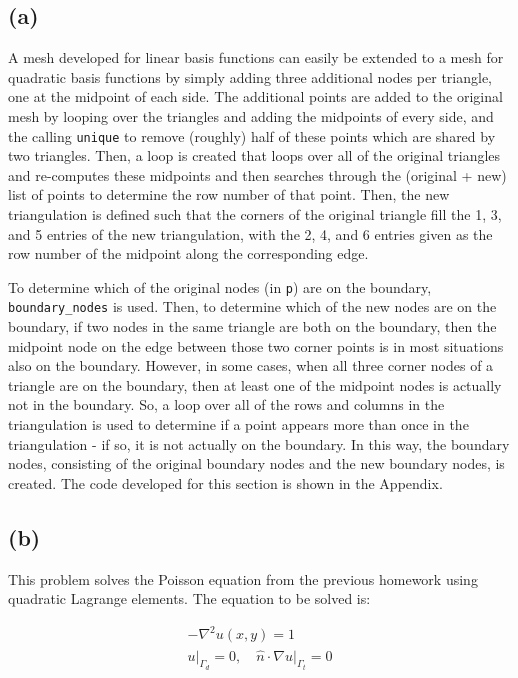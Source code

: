 \documentclass[10pt]{article}
\newcommand{\beqa}{\begin{equation}\begin{aligned}}
\newcommand{\eeqa}{\end{aligned}\end{equation}}
\begin{document}
\subsection{(a)}

A mesh developed for linear basis functions can easily be extended to a mesh for quadratic basis functions by simply adding three additional nodes per triangle, one at the midpoint of each side. The additional points are added to the original mesh by looping over the triangles and adding the midpoints of every side, and the calling {\tt unique} to remove (roughly) half of these points which are shared by two triangles. Then, a loop is created that loops over all of the original triangles and re-computes these midpoints and then searches through the (original + new) list of points to determine the row number of that point. Then, the new triangulation is defined such that the corners of the original triangle fill the 1, 3, and 5 entries of the new triangulation, with the 2, 4, and 6 entries given as the row number of the midpoint along the corresponding edge.

To determine which of the original nodes (in {\tt p}) are on the boundary, {\tt boundary\_nodes} is used. Then, to determine which of the new nodes are on the boundary, if two nodes in the same triangle are both on the boundary, then the midpoint node on the edge between those two corner points is in most situations also on the boundary. However, in some cases, when all three corner nodes of a triangle are on the boundary, then at least one of the midpoint nodes is actually not in the boundary. So, a loop over all of the rows and columns in the triangulation is used to determine if a point appears more than once in the triangulation - if so, it is not actually on the boundary. In this way, the boundary nodes, consisting of the original boundary nodes and the new boundary nodes, is created. The code developed for this section is shown in the Appendix.

\subsection{(b)}

This problem solves the Poisson equation from the previous homework using quadratic Lagrange elements. The equation to be solved is:

\beqa
-\nabla^2u(x,y)=1\\
u\rvert_{\Gamma_d}=0,\quad \hat{n}\cdot\nabla u\rvert_{\Gamma_t}=0\\
\eeqa
\end{document}
